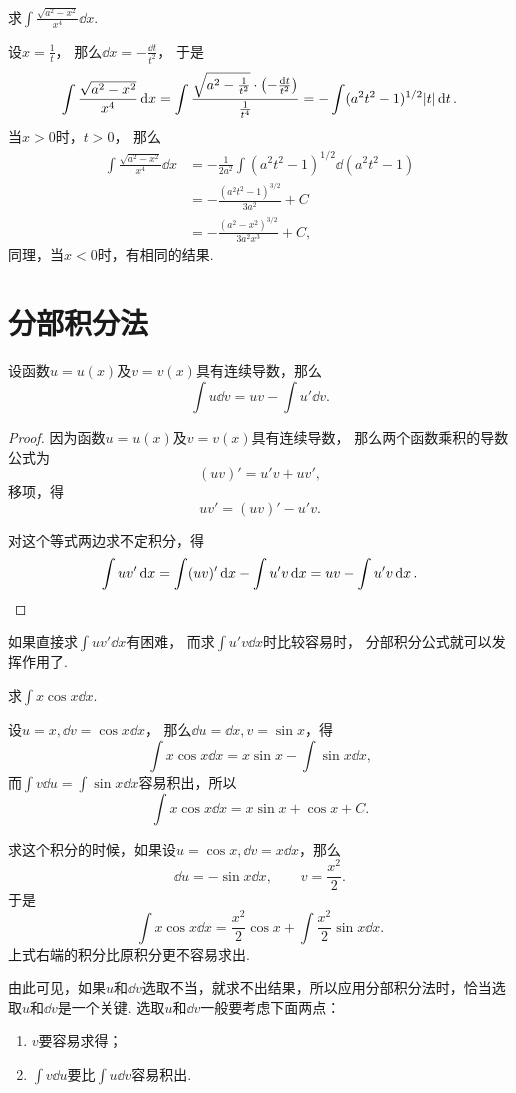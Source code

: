 \begin{example}
求\(\int \frac{\sqrt{a^2 - x^2}}{x^4} \dd{x}\).
\begin{solution}
设\(x = \frac{1}{t}\)，
那么\(\dd{x} = -\frac{\dd{t}}{t^2}\)，
于是\[
	\int \frac{\sqrt{a^2 - x^2}}{x^4} \dd{x}
	= \int \frac{\sqrt{a^2 - \frac{1}{t^2}} \cdot \left( -\frac{\dd{t}}{t^2} \right)}{\frac{1}{t^4}}
	= -\int (a^2 t^2 - 1)^{1/2} \abs{t} \dd{t}.
\]
当\(x > 0\)时，\(t > 0\)，
那么\begin{align*}
	\int \frac{\sqrt{a^2 - x^2}}{x^4} \dd{x}
	&= -\frac{1}{2a^2} \int (a^2 t^2 - 1)^{1/2} \dd(a^2 t^2 - 1) \\
	&= -\frac{(a^2 t^2 - 1)^{3/2}}{3 a^2} + C \\
	&= -\frac{(a^2 - x^2)^{3/2}}{3 a^2 x^3} + C,
\end{align*}
同理，当\(x < 0\)时，有相同的结果.
\end{solution}
\end{example}

\section{分部积分法}
\begin{theorem}[分部积分公式]
设函数\(u=u(x)\)及\(v=v(x)\)具有连续导数，那么\[
	\int u \dd{v} = uv - \int u' \dd{v}.
\]
\begin{proof}
因为函数\(u=u(x)\)及\(v=v(x)\)具有连续导数，
那么两个函数乘积的导数公式为\[
	(uv)' = u'v + uv',
\]
移项，得\[
	uv' = (uv)' - u'v.
\]

对这个等式两边求不定积分，得\[
	\int u v' \dd{x} = \int (uv)' \dd{x} - \int u' v \dd{x}
	= uv - \int u' v \dd{x}.
	\qedhere
\]
\end{proof}
\end{theorem}
如果直接求\(\int u v' \dd{x}\)有困难，
而求\(\int u' v \dd{x}\)时比较容易时，
分部积分公式就可以发挥作用了.

\begin{example}
求\(\int x \cos x \dd{x}\).
\begin{solution}
设\(u = x, \dd{v} = \cos x \dd{x}\)，
那么\(\dd{u} = \dd{x}, v = \sin x\)，得\[
	\int x \cos x \dd{x}
	= x \sin x - \int \sin x \dd{x},
\]
而\(\int v \dd{u} = \int \sin x \dd{x}\)容易积出，所以\[
	\int x \cos x \dd{x}
	= x \sin x + \cos x + C.
\]

求这个积分的时候，如果设\(u = \cos x, \dd{v} = x \dd{x}\)，那么\[
\dd{u} = -\sin x \dd{x}, \qquad v = \frac{x^2}{2}.
\]于是\[
\int x \cos x \dd{x} = \frac{x^2}{2} \cos x + \int \frac{x^2}{2} \sin x \dd{x}.
\]上式右端的积分比原积分更不容易求出.
\end{solution}
\end{example}
由此可见，如果\(u\)和\(\dd{v}\)选取不当，就求不出结果，所以应用分部积分法时，恰当选取\(u\)和\(\dd{v}\)是一个关键.
选取\(u\)和\(\dd{v}\)一般要考虑下面两点：\begin{enumerate}
\item \(v\)要容易求得；
\item \(\int v \dd{u}\)要比\(\int u \dd{v}\)容易积出.
\end{enumerate}

